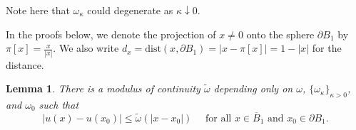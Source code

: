 \documentclass[letter,11pt]{amsart}
\newtheorem{lem}[thm]{Lemma}
\theoremstyle{definition}
\numberwithin{equation}{section}
\begin{document}
\medskip

Note here that $\omega_{\kappa}$ could degenerate as $\kappa \downarrow 0$.

\medskip

In the proofs below, we denote the projection of $x \neq 0$ onto the sphere $\partial B_1$ by $\pi[x] = \frac{x}{|x|}$.
We also write $d_x = \textrm{dist}(x, \partial B_1) = |x - \pi[x]| = 1 -|x|$ for the distance.


\medskip

\begin{lem}
There is a modulus of continuity $\widetilde{\omega}$ depending only on $\omega$, $\{\omega_{\kappa}\}_{\kappa > 0}$, and $\omega_0$ such that
\[
|u(x) - u(x_0)| \leq \widetilde{\omega}(|x-x_0|) \quad \text{ for all } x \in \overline{B}_{1} \text{ and } x_0 \in \partial B_1.
\]
\end{lem}
\end{document}
